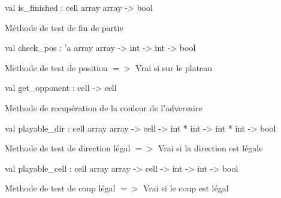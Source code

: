 \documentclass[11pt]{article}
\begin{document}
\label{val:Othello.is-underscorefinished}\begin{ocamldoccode}
val is_finished : cell array array -> bool
\end{ocamldoccode}
\begin{ocamldocdescription}
Méthode de test de fin de partie


\end{ocamldocdescription}




\label{val:Othello.check-underscorepos}\begin{ocamldoccode}
val check_pos : 'a array array -> int -> int -> bool
\end{ocamldoccode}
\begin{ocamldocdescription}
Methode de test de position $=$$>$ Vrai si sur le plateau


\end{ocamldocdescription}




\label{val:Othello.get-underscoreopponent}\begin{ocamldoccode}
val get_opponent : cell -> cell
\end{ocamldoccode}
\begin{ocamldocdescription}
Methode de recupération de la couleur de l'adversaire


\end{ocamldocdescription}




\label{val:Othello.playable-underscoredir}\begin{ocamldoccode}
val playable_dir : cell array array -> cell -> int * int -> int * int -> bool
\end{ocamldoccode}
\begin{ocamldocdescription}
Methode de test de direction légal $=$$>$ Vrai si la direction est légale


\end{ocamldocdescription}




\label{val:Othello.playable-underscorecell}\begin{ocamldoccode}
val playable_cell : cell array array -> cell -> int -> int -> bool
\end{ocamldoccode}
\begin{ocamldocdescription}
Methode de test de coup légal $=$$>$ Vrai si le coup est légal


\end{ocamldocdescription}
\end{document}
